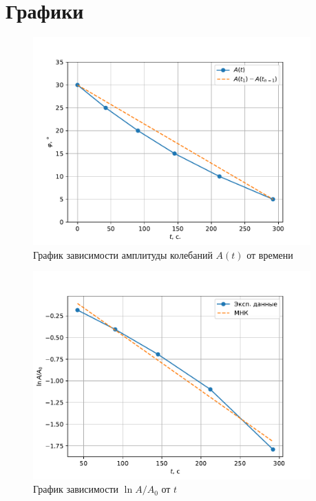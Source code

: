 \clearpage
\section{Графики}
\begin{figure}[ht]
  \begin{center}
    \includegraphics[width=0.95\textwidth]{figures/ampl_t.pdf}
  \end{center}
  \caption{График зависимости амплитуды колебаний $A(t)$ от времени}\label{fig:ampl_t}
\end{figure}

\begin{figure}[ht]
  \begin{center}
    \includegraphics[width=0.95\textwidth]{figures/ln.pdf}
  \end{center}
  \caption{График зависимости $\ln A/A_0$ от $t$}\label{fig:ln}
\end{figure}

